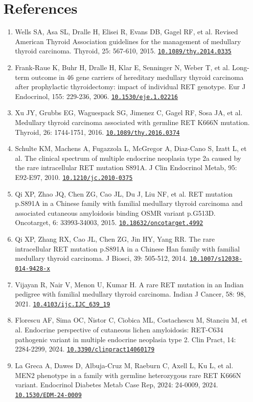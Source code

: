 \documentclass[12pt]{article}
\newcommand{\doi}[1]{\href{https://doi.org/#1}{\nolinkurl{#1}}}
\begin{document}
\clearpage
\section*{References}
\begin{enumerate}
\item Wells SA, Asa SL, Dralle H, Elisei R, Evans DB, Gagel RF, et al. Revised American Thyroid Association guidelines for the management of medullary thyroid carcinoma. Thyroid, 25: 567-610, 2015. \doi{10.1089/thy.2014.0335}
\item Frank-Raue K, Buhr H, Dralle H, Klar E, Senninger N, Weber T, et al. Long-term outcome in 46 gene carriers of hereditary medullary thyroid carcinoma after prophylactic thyroidectomy: impact of individual RET genotype. Eur J Endocrinol, 155: 229-236, 2006. \doi{10.1530/eje.1.02216}
\item Xu JY, Grubbs EG, Waguespack SG, Jimenez C, Gagel RF, Sosa JA, et al. Medullary thyroid carcinoma associated with germline RET K666N mutation. Thyroid, 26: 1744-1751, 2016. \doi{10.1089/thy.2016.0374}
\item Schulte KM, Machens A, Fugazzola L, McGregor A, Diaz-Cano S, Izatt L, et al. The clinical spectrum of multiple endocrine neoplasia type 2a caused by the rare intracellular RET mutation S891A. J Clin Endocrinol Metab, 95: E92-E97, 2010. \doi{10.1210/jc.2010-0375}
\item Qi XP, Zhao JQ, Chen ZG, Cao JL, Du J, Liu NF, et al. RET mutation p.S891A in a Chinese family with familial medullary thyroid carcinoma and associated cutaneous amyloidosis binding OSMR variant p.G513D. Oncotarget, 6: 33993-34003, 2015. \doi{10.18632/oncotarget.4992}
\item Qi XP, Zhang RX, Cao JL, Chen ZG, Jin HY, Yang RR. The rare intracellular RET mutation p.S891A in a Chinese Han family with familial medullary thyroid carcinoma. J Biosci, 39: 505-512, 2014. \doi{10.1007/s12038-014-9428-x}
\item Vijayan R, Nair V, Menon U, Kumar H. A rare RET mutation in an Indian pedigree with familial medullary thyroid carcinoma. Indian J Cancer, 58: 98, 2021. \doi{10.4103/ijc.IJC_639_19}
\item Florescu AF, Sima OC, Nistor C, Ciobica ML, Costachescu M, Stanciu M, et al. Endocrine perspective of cutaneous lichen amyloidosis: RET-C634 pathogenic variant in multiple endocrine neoplasia type 2. Clin Pract, 14: 2284-2299, 2024. \doi{10.3390/clinpract14060179}
\item La Greca A, Dawes D, Albuja-Cruz M, Raeburn C, Axell L, Ku L, et al. MEN2 phenotype in a family with germline heterozygous rare RET K666N variant. Endocrinol Diabetes Metab Case Rep, 2024: 24-0009, 2024. \doi{10.1530/EDM-24-0009}

\end{enumerate}
\end{document}
